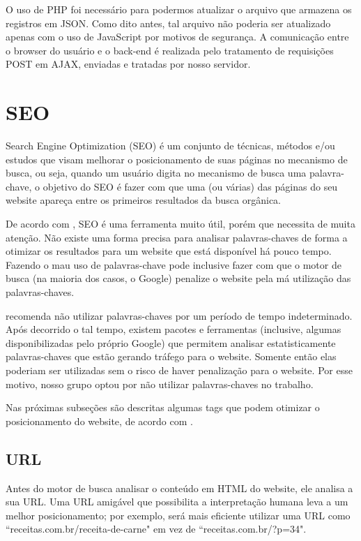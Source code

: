 \documentclass{article}
\begin{document}
O uso de PHP foi necessário para podermos atualizar o arquivo que armazena os registros em JSON. Como dito antes, tal arquivo não poderia ser atualizado apenas com o uso de JavaScript por motivos de segurança. A comunicação entre o browser do usuário e o back-end é realizada pelo tratamento de requisições POST  em AJAX, enviadas e tratadas por nosso servidor.

\section{SEO}
Search Engine Optimization (SEO) é um conjunto de técnicas, métodos e/ou estudos que visam melhorar o posicionamento de suas páginas no mecanismo de busca, ou seja, quando um usuário digita no mecanismo de busca uma palavra-chave, o objetivo do SEO é fazer com que uma (ou várias) das páginas do seu website apareça entre os primeiros resultados da busca orgânica.

De acordo com \cite{kadavy}, SEO é uma ferramenta muito útil, porém que necessita de muita atenção. Não existe uma forma precisa para analisar palavras-chaves de forma a otimizar os resultados para um website que está disponível há pouco tempo. Fazendo o mau uso de palavras-chave pode inclusive fazer com que o motor de busca (na maioria dos casos, o Google) penalize o website pela má utilização das palavras-chaves.


\cite{kadavy} recomenda não utilizar palavras-chaves por um período de tempo indeterminado. Após decorrido o tal tempo, existem pacotes e ferramentas (inclusive, algumas disponibilizadas pelo próprio Google) que permitem analisar estatisticamente palavras-chaves que estão gerando tráfego para o website. Somente então elas poderiam ser utilizadas sem o risco de haver penalização para o website. Por esse motivo, nosso grupo optou por não utilizar palavras-chaves no trabalho.

Nas próximas subseções são descritas algumas tags que podem otimizar o posicionamento do website, de acordo com \cite{kadavy}.

\subsection*{URL}
Antes do motor de busca analisar o conteúdo em HTML do website, ele analisa a sua URL. Uma URL amigável que possibilita a interpretação humana leva a um melhor posicionamento; por exemplo, será mais eficiente utilizar  uma URL como ``receitas.com.br/receita-de-carne" em vez de ``receitas.com.br/?p=34".
\end{document}
